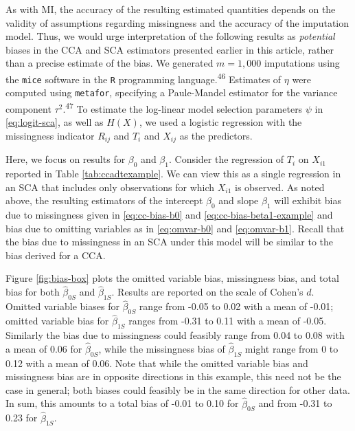 \documentclass[
]{article}
\begin{document}
As with MI, the accuracy of the resulting estimated quantities depends on the validity of assumptions regarding missingness and the accuracy of the imputation model.
Thus, we would urge interpretation of the following results as \emph{potential} biases in the CCA and SCA estimators presented earlier in this article, rather than a precise estimate of the bias.
We generated \(m = 1,000\) imputations using the \texttt{mice} software in the \texttt{R} programming language.\textsuperscript{46}
Estimates of \(\eta\) were computed using \texttt{metafor}, specifying a Paule-Mandel estimator for the variance component \(\tau^2\).\textsuperscript{47}
To estimate the log-linear model selection parameters \(\psi\) in \eqref{eq:logit-sca}, as well as \(H(X)\), we used a logistic regression with the missingness indicator \(R_{ij}\) and \(T_i\) and \(X_{ij}\) as the predictors.

Here, we focus on results for \(\beta_0\) and \(\beta_1\).
Consider the regression of \(T_i\) on \(X_{i1}\) reported in Table \ref{tab:ccadtexample}.
We can view this as a single regression in an SCA that includes only observations for which \(X_{i1}\) is observed.
As noted above, the resulting estimators of the intercept \(\beta_0\) and slope \(\beta_1\) will exhibit bias due to missingness given in \eqref{eq:cc-bias-b0} and \eqref{eq:cc-bias-beta1-example} and bias due to omitting variables as in \eqref{eq:omvar-b0} and \eqref{eq:omvar-b1}.
Recall that the bias due to missingness in an SCA under this model will be similar to the bias derived for a CCA.

Figure \ref{fig:bias-box} plots the omitted variable bias, missingness bias, and total bias for both \(\hat{\beta}_{0S}\) and \(\hat{\beta}_{1S}\).
Results are reported on the scale of Cohen's \(d\).
Omitted variable biases for \(\hat{\beta}_{0S}\) range from -0.05 to 0.02 with a mean of -0.01; omitted variable bias for \(\hat{\beta}_{1S}\) ranges from -0.31 to 0.11 with a mean of -0.05.
Similarly the bias due to missingness could feasibly range from 0.04 to 0.08 with a mean of 0.06 for \(\hat{\beta}_{0S}\), while the missingness bias of \(\hat{\beta}_{1S}\) might range from 0 to 0.12 with a mean of 0.06.
Note that while the omitted variable bias and missingness bias are in opposite directions in this example, this need not be the case in general; both biases could feasibly be in the same direction for other data.
In sum, this amounts to a total bias of -0.01 to 0.10 for \(\hat{\beta}_{0S}\) and from -0.31 to 0.23 for \(\hat{\beta}_{1S}\).
\end{document}
